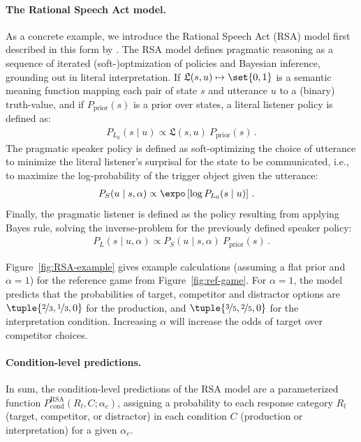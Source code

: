 \documentclass[fleqn]{article}
\begin{document}
\paragraph{The Rational Speech Act model.}
As a concrete example, we introduce the Rational Speech Act (RSA) model first described in this form by \citet{FrankGoodman2012:Predicting-Prag} \citep[for overview see][]{FrankeJager2015:Probabilistic-p,GoodmanFrank2016:Pragmatic-Langu,StevensBenz2018:Game-Theoretic-,ScontrasTessler2021:A-practical-int,Degen2023:The-Rational-Sp}.
The RSA model defines pragmatic reasoning as a sequence of iterated (soft-)optmization of policies and Bayesian inference, grounding out in literal interpretation.
If $\mathfrak{L}(s,u) \mapsto \set{0,1}$ is a semantic meaning function mapping each pair of state $s$ and utterance $u$ to a (binary) truth-value, and if $P_{\text{prior}}(s)$ is a prior over states, a literal listener policy is defined as:
%
\begin{align*}
 P_{L_{0}}(s \mid u) \propto \mathfrak{L}(s,u)\  P_{\text{prior}}(s)\,.
\end{align*}
%
The pragmatic speaker policy is defined as soft-optimizing the choice of utterance to minimize the literal listener's surprisal for the state to be communicated, i.e., to maximize the log-probability of the trigger object given the utterance:
%
\begin{align}
  \label{eq:RSA-speaker}
  P_{S}(u \mid s, \alpha) & \propto \expo \left [ \log P_{L_{0}}(s \mid u) \right ] \,.
\end{align}
%
Finally, the pragmatic listener is defined as the policy resulting from applying Bayes rule, solving the inverse-problem for the previously defined speaker policy:
%
\begin{align}
  \label{eq:RSA-interpreter}
  P_{L}(s \mid u, \alpha) \propto  P_{S}(u \mid s, \alpha) \  P_{\text{prior}}(s) \,.
\end{align}


Figure~\ref{fig:RSA-example} gives example calculations (assuming a flat prior and $\alpha=1$) for the reference game from Figure~\ref{fig:ref-game}.
For $\alpha=1$, the model predicts that the probabilities of target, competitor and distractor options are $\tuple{\nicefrac{2}{3}, \nicefrac{1}{3}, 0}$ for the production, and $\tuple{\nicefrac{3}{5}, \nicefrac{2}{5}, 0}$ for the interpretation condition.
Increasing $\alpha$ will increase the odds of target over competitor choices.

\paragraph{Condition-level predictions.}
In sum, the condition-level predictions of the RSA model are a parameterized function $P_{\text{cond}}^{\text{RSA}}(R_{l}, C; \alpha_{c})$, assigning a probability to each response category $R_{l}$ (target, competitor, or distractor) in each condition $C$ (production or interpretation) for a given $\alpha_{c}$.
\end{document}
